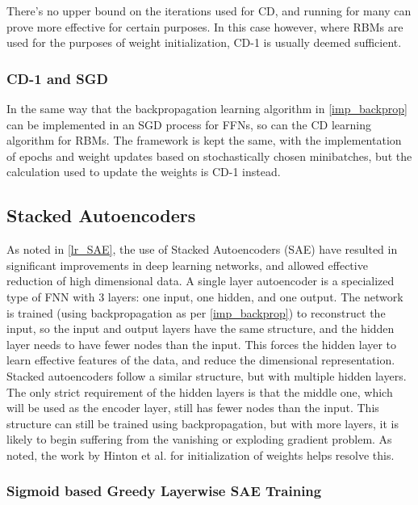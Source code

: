 \documentclass[a4paper,11pt,oneside]{article}
\theoremstyle{plain}
\theoremstyle{definition}
\begin{document}
There's no upper bound on the iterations used for CD, and running for many can prove more effective for certain purposes. In this case however, where RBMs are used for the purposes of weight initialization, CD-1 is usually deemed sufficient.

\subsubsection{CD-1 and SGD}

In the same way that the backpropagation learning algorithm in \ref{imp_backprop} can be implemented in an SGD process for FFNs, so can the CD learning algorithm for RBMs. The framework is kept the same, with the implementation of epochs and weight updates based on stochastically chosen minibatches, but the calculation used to update the weights is CD-1 instead.


\subsection{Stacked Autoencoders}\label{imp_SAE}

As noted in \ref{lr_SAE}, the use of Stacked Autoencoders (SAE) have resulted in significant improvements in deep learning networks, and allowed effective reduction of high dimensional data. A single layer autoencoder is a specialized type of FNN with 3 layers: one input, one hidden, and one output. The network is trained (using backpropagation as per \ref{imp_backprop}) to reconstruct the input, so the input and output layers have the same structure, and the hidden layer needs to have fewer nodes than the input. This forces the hidden layer to learn effective features of the data, and reduce the dimensional representation. 
\newline\newline
Stacked autoencoders follow a similar structure, but with multiple hidden layers. The only strict requirement of the hidden layers is that the middle one, which will be used as the encoder layer, still has fewer nodes than the input. This structure can still be trained using backpropagation, but with more layers, it is likely to begin suffering from the vanishing or exploding gradient problem. As noted, the work by Hinton et al. for initialization of weights helps resolve this.

\subsubsection{Sigmoid based Greedy Layerwise SAE Training}\label{imp_sigmoidsae}
\end{document}

